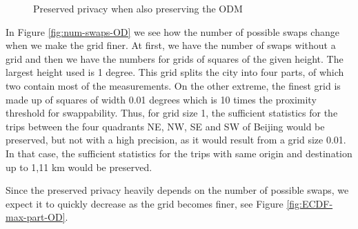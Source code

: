\documentclass[times,twocolumn,final,authoryear]{elsarticle}
\begin{document}
\begin{figure}
\centering
  \caption{Preserved privacy when also preserving the ODM}
  \label{fig:OD}
\end{figure}

In Figure \ref{fig:num-swaps-OD} we see how the number of possible
swaps change when we make the grid finer. At first, we have the number
of swaps without a grid and then we have the numbers for grids of
squares of the given height. The largest height used is 1 degree.
This grid splits the city into four parts, of which two contain
most of the measurements. On the other extreme, the finest grid is made up of squares of width 0.01 degrees which is 10 times the proximity threshold for swappability.  
{\color{blue} 
Thus, for grid size 1, the sufficient statistics for the trips between the four quadrants NE, NW, SE and SW of Beijing would be preserved, but not with a high precision, as it would result from a grid size 0.01. In that case, the sufficient statistics for the trips with same origin and destination up to 1,11 km would be preserved.
}

Since the preserved privacy heavily depends on the number of possible
swaps, we expect it to quickly decrease as the grid becomes finer, see Figure
\ref{fig:ECDF-max-part-OD}. 
\end{document}
